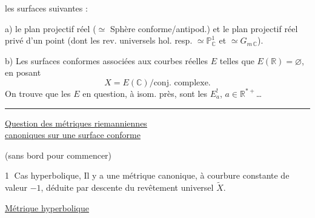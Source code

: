 les surfaces suivantes :

a) le plan projectif réel ($\simeq$ Sphère conforme/antipod.) et le plan projectif réel privé d'un point (dont les rev. universels hol. resp. $\simeq\mathbb P^1_{\mathbb C}$ et $\simeq G_{m\,\mathbb C}$).

b) Les surfaces conformes associées aux courbes  réelles $E$ telles que $E(\mathbb R)=\varnothing$, en posant 
\[
X=E(\mathbb C)/\text{conj. complexe}.
\]
On trouve que les $E$ en question, à isom. près, sont les $E_a^!$, $a\in\mathbb R^{*+}$\ldots

\rule{\linewidth}{0.3pt}

\uline{Question des  métriques riemanniennes}\\
\uline{canoniques sur une surface conforme}

(sans bord pour commencer)

\textcircled{1} Cas hyperbolique, Il y a une métrique canonique, à courbure constante de valeur $-1$, déduite par descente du revêtement universel $\widetilde X$.

\uline{Métrique hyperbolique}
